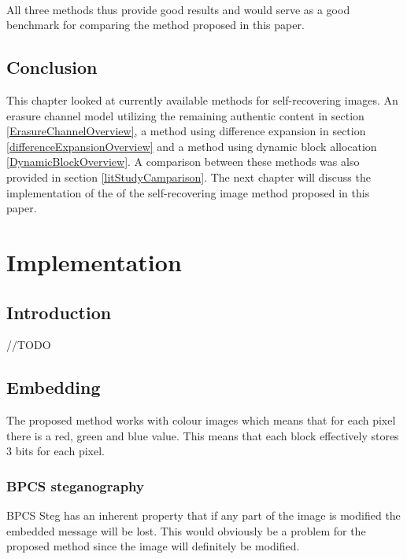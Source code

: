 \documentclass[12pt]{article}
\begin{document}
\hspace{0pt} \\
All three methods thus provide good results and would serve as a good benchmark for comparing the method proposed in this paper.

\subsection{Conclusion}
This chapter looked at currently available methods for self-recovering images.
An erasure channel model utilizing the remaining authentic content in section \ref{ErasureChannelOverview}, a method using difference expansion in section \ref{differenceExpansionOverview} and a method using dynamic block allocation \ref{DynamicBlockOverview}.
A comparison between these methods was also provided in section \ref{litStudyCamparison}.
The next chapter will discuss the implementation of the of the self-recovering image method proposed in this paper.  

\section{Implementation}
\label{Implementation}
\subsection{Introduction}
//TODO

\subsection{Embedding}
\label{embedding}

The proposed method works with colour images which means that for each pixel there is a red, green and blue value. This means that each block effectively stores 3 bits for each pixel.

\subsubsection{BPCS steganography} 
\label{bpcsSteg}

BPCS Steg has an inherent property that if any part of the image is modified the embedded message will be lost.
This would obviously be a problem for the proposed method since the image will definitely be modified.
\end{document}
